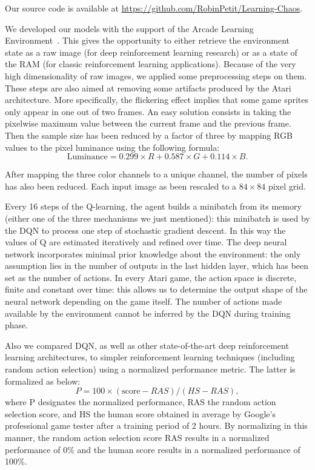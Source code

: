 \documentclass[letterpaper]{article}
\begin{document}
Our source code is available at \url{https://github.com/RobinPetit/Learning-Chaos}.

We developed our models with the support of the Arcade Learning Environment~\citep{bellemare13arcade}. This gives the opportunity to either
retrieve the environment state as a raw image (for deep reinforcement learning research) or as a state of the RAM (for classic reinforcement learning
applications). Because of the very high dimensionality of raw images, we applied some preprocessing steps on them. These steps are also aimed at
removing some artifacts produced by the Atari architecture. More specifically, the flickering effect implies that some game sprites only appear
in one out of two frames. An easy solution consists in taking the pixelwise maximum value between the current frame and the previous frame.
Then the sample size has been reduced by a factor of three by mapping RGB values to the pixel luminance using the following formula:
\begin{equation}
    \text{Luminance} = 0.299 \times R + 0.587 \times G + 0.114 \times B.
\end{equation}

After mapping the three color channels to a unique channel, the number of pixels has also been reduced. Each input image as been rescaled to a
$84 \times 84$ pixel grid.

Every 16 steps of the Q-learning, the agent builds a minibatch from its memory (either one of the three mechanisms we just mentioned):
this minibatch is used by the DQN to process one step of stochastic gradient descent. In this way the values of Q are estimated iteratively and
refined over time. The deep neural network incorporates minimal prior knowledge about the environment: the only assumption lies in the number of
outputs in the last hidden layer, which has been set as the number of actions. In every Atari game, the action space is discrete, finite and constant over time:
this allows us to determine the output shape of the neural network depending on the game itself. The number of actions made available by the environment
cannot be inferred by the DQN during training phase.

Also we compared DQN, as well as other state-of-the-art deep reinforcement learning architectures, to simpler reinforcement learning techniques (including
random action selection) using a normalized performance metric. The latter is formalized as below:
\begin{equation}
    P = 100 \times (\text{score} - RAS) / (HS - RAS),
\end{equation}
where P designates the normalized performance, RAS the random action selection score, and HS the human score obtained in average by Google's professional
game tester after a training period of 2 hours.  By normalizing in this manner, the random action selection score RAS results in a normalized performance
of 0\% and the human score results in a normalized performance of 100\%.
\end{document}
